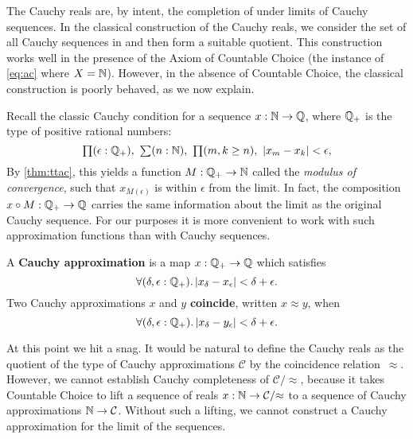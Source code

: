 The Cauchy reals are, by intent, the completion of \Q under limits of Cauchy sequences.
In the classical construction of the Cauchy reals, we consider the set of all Cauchy sequences in \Q and then form a suitable quotient.
This construction works well in the presence of the Axiom of Countable Choice (the instance of \autoref{eq:ac} where $X=\mathbb{N}$).
However, in the absence of Countable Choice, the classical construction is poorly behaved, as we now explain.

Recall the classic Cauchy condition for a sequence $x : \mathbb{N} \to \mathbb{Q}$, where $\mathbb{Q}_{+}$ is the
type of positive rational numbers:
%
\[ \prd{\epsilon : \Qp} \sm{n : \N} \prd{m, k \geq n} |x_m - x_k| < \epsilon, \]
%
By \autoref{thm:ttac}, this yields a function $M : \mathbb{Q}_{+} \to \mathbb{N}$ called the \emph{modulus of convergence}, such that $x_{M(\epsilon)}$ is within $\epsilon$
from the limit. In fact, the composition $x \circ M : \mathbb{Q}_{+} \to \mathbb{Q}$ carries the same
information about the limit as the original Cauchy sequence. For our purposes it is more
convenient to work with such approximation functions than with Cauchy sequences.

\begin{defn}\label{defn:cauchy-approximation}
  A \textbf{Cauchy approximation} is a map $x : \mathbb{Q}_{+} \to \mathbb{Q}$ which satisfies
  \begin{equation}
    \label{eq:cauchy-approx}
    \fall{\delta, \epsilon :\Qp} |x_\delta - x_\epsilon| < \delta + \epsilon.
  \end{equation}
  Two Cauchy approximations $x$ and $y$ \textbf{coincide}, written $x \approx y$, when
  \begin{equation}
    \label{eq:cauchy-coincide}
    \fall{\delta, \epsilon:\Qp} |x_\delta - y_\epsilon| < \delta + \epsilon.
  \end{equation}
\end{defn}

At this point we hit a snag. It would be natural to define the Cauchy reals as the
quotient of the type of Cauchy approximations $\mathcal{C}$ by the coincidence
relation~$\approx$. However, we cannot establish Cauchy completeness of $\mathcal{C}/{\approx}$,
because it takes Countable Choice to lift a sequence of reals $x : \mathbb{N} \to
\mathcal{C}/{\approx}$ to a sequence of Cauchy approximations $\mathbb{N} \to \mathcal{C}$.
Without such a lifting, we cannot construct a Cauchy approximation for the limit of the sequences.

